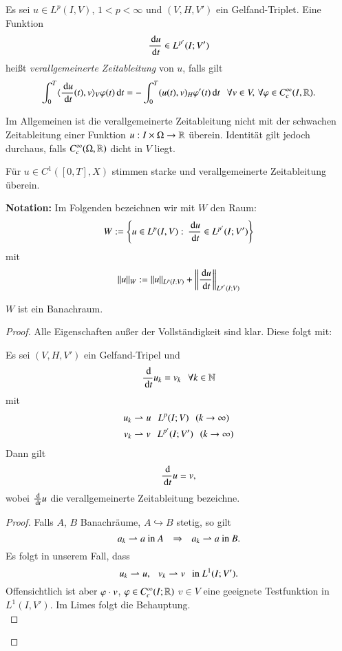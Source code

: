 \begin{defi}\label{4.34}
    Es sei $u\in L^p(I,V)$, $1<p<\infty$ und $(V,H,V')$ ein Gelfand-Triplet. Eine Funktion
    \[
        \frac{\, \mathrm{d} u}{\, \mathrm{d} t} \in L^{p'} (I;V')
    \]
    heißt \textit{verallgemeinerte Zeitableitung} von $u$, falls gilt
    \[
        \int_0^T\langle \frac{\, \mathrm{d} u}{\, \mathrm{d} t} (t), v\rangle _V \varphi (t)\, \mathrm{d} t = -\int_0^T(u(t),v)_H \varphi'(t)\, \mathrm{d} t
        \hspace{.25cm} \forall v\in V,\, \forall \varphi \in C_c^\infty (I,\mathbb{R}).
    \]
\end{defi}

\begin{remark}
    Im Allgemeinen ist die verallgemeinerte Zeitableitung nicht mit der schwachen Zeitableitung einer
    Funktion $u:I\times \Omega\rightarrow \mathbb{R}$ überein. Identität gilt jedoch durchaus, falls 
    $C^\infty_c(\Omega,\mathbb{R})$ dicht in $V$ liegt.
\end{remark}

\begin{remark}
    Für $u\in C^1([0,T], X)$ stimmen starke und verallgemeinerte Zeitableitung überein. 
\end{remark}

\noindent \textbf{Notation:} Im Folgenden bezeichnen wir mit $W$ den Raum:
\[
    W:=\left\{u\in L^p(I,V): \, \frac{\, \mathrm{d} u}{\, \mathrm{d} t}\in L^{p'}(I; V')\right\}
\]
mit
\[
    \|u\|_W:= \|u\|_{L^p(I;V)} + \left\|\frac{\, \mathrm{d} u}{\, \mathrm{d} t}\right\|_{L^{p'}(I;V)}
\]

\begin{prop}\label{4.34}
    $W$ ist ein Banachraum.
\end{prop}

\begin{proof}
    Alle Eigenschaften außer der Vollständigkeit sind klar. Diese folgt mit:

    \begin{prop}\label{4.35}
        Es sei $(V,H,V')$ ein Gelfand-Tripel und
        \[
            \frac{\, \mathrm{d}}{\, \mathrm{d} t} u_k = v_k \hspace{.25cm} \forall k\in \mathbb{N}
        \]
        mit
        \begin{align*}
            u_k&\rightharpoonup u \hspace{.25cm} L^p(I;V) \hspace{.25cm} (k\rightarrow \infty)\\
            v_k&\rightharpoonup v \hspace{.25cm} L^{p'}(I;V') \hspace{.25cm} (k\rightarrow \infty)
        \end{align*}
        Dann gilt
        \[
            \frac{\, \mathrm{d} }{\, \mathrm{d} t} u =v,
        \]
        wobei $\frac{\, \mathrm{d}}{\, \mathrm{d} t} u$ die verallgemeinerte Zeitableitung bezeichne.
    \end{prop}
    \begin{proof}
        Falls $A$, $B$ Banachräume, $A\hookrightarrow B$ stetig, so gilt 
        \[
            a_k\rightharpoonup a \text{ in }  A \hspace{.25cm} \Rightarrow \hspace{.25cm} a_k\rightharpoonup a \text{ in } B.
        \]
        Es folgt in unserem Fall, dass
        \[
            u_k\rightharpoonup u, \hspace{.25cm} v_k\rightharpoonup v \hspace{.25cm} \text{in }L^1(I;V').
        \]
        Offensichtlich ist aber $\varphi \cdot v$, $\varphi \in C_c^\infty (I;\mathbb{R})$ $v\in V$ eine geeignete
        Testfunktion in $L^1(I,V')$. Im Limes folgt die Behauptung.\[ \]
    \end{proof}
    \[ \]
\end{proof}
